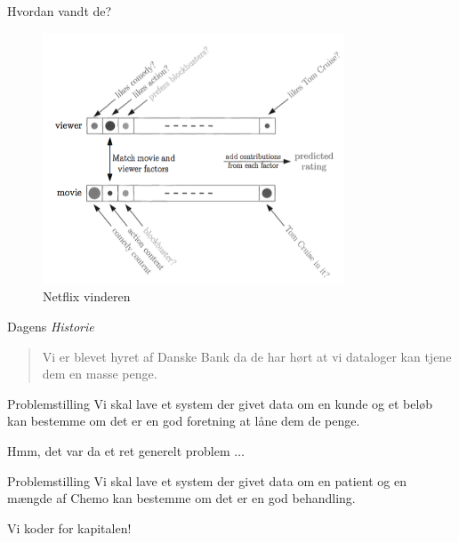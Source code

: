 \documentclass[12pt,t]{beamer}
\begin{document}
    \begin{frame}{Hvordan vandt de?}
        \begin{figure}[h!]
            \caption{Netflix vinderen}
            \centering
            \includegraphics[width=0.8\textwidth]{include/netflix.png}
        \end{figure}
    \end{frame}

    \begin{frame}[t]{Dagens \emph{Historie}}
        \begin{quote}
            Vi er blevet hyret af Danske Bank da de har hørt at vi dataloger
            kan tjene dem en masse penge.
        \end{quote}
        \pause
        \begin{block}{Problemstilling}
            Vi skal lave et system der givet data om en kunde og et beløb kan
            bestemme om det er en god foretning at låne dem de penge.
        \end{block}
        \pause
        \centering Hmm, det var da et ret generelt problem $\dots$
        \pause
        \begin{block}{Problemstilling}
            Vi skal lave et system der givet data om en \alert{patient} og
            \alert{en mængde af Chemo} kan bestemme om det er en god behandling.
        \end{block}
        \pause
        \centering Vi koder for kapitalen!
    \end{frame}
\end{document}
